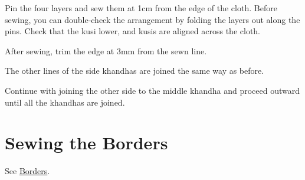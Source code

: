 

Pin the four layers and sew them at 1cm from the edge of the cloth.
Before sewing, you can double-check the arrangement by folding the
layers out along the pins. Check that the kusi lower, and kusis are
aligned across the cloth.






After sewing, trim the edge at 3mm from the sewn line.


The other lines of the side khandhas are joined the same way as before.

Continue with joining the other side to the middle khandha and proceed
outward until all the khandhas are joined.

\section{Sewing the Borders}

See \href{/en/borders}{Borders}.

